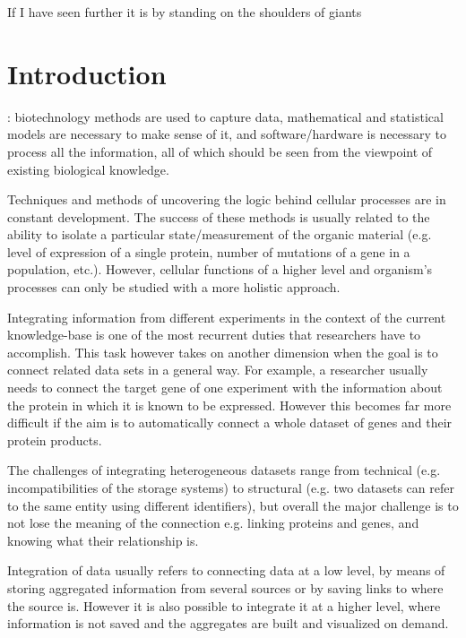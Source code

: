 \begin{savequote}[75mm] 
If I have seen further it is by standing on the shoulders of giants
\end{savequote}

\chapter{Introduction} \label{ch:introduction}

: biotechnology methods are used to capture data, mathematical and statistical models are necessary to make sense of it, and software/hardware is necessary to process all the information,  all of which should be seen from the viewpoint of existing biological knowledge.

Techniques and methods of uncovering the logic behind cellular processes are in constant development. The success of these methods is usually related to the ability to isolate a particular state/measurement of the organic material (e.g. level of expression of a single protein, number of mutations of a gene in a population, etc.). However,  cellular functions of a higher level and organism's processes can only be studied with a more holistic approach.

Integrating information from different experiments in the context of the current knowledge-base is one of the most recurrent duties that researchers have to accomplish. This task however takes on another dimension when the goal is to connect related data sets in a general way. For example, a researcher usually needs to connect the target gene of one experiment with the information about the protein in which it is known to be expressed.  However this becomes far more difficult if the aim is to automatically connect a whole dataset of genes and their protein products.

The challenges of integrating heterogeneous datasets range from technical (e.g. incompatibilities of the storage systems) to structural (e.g. two datasets can refer to the same entity using different identifiers), but overall the major challenge is to not lose the meaning of the connection e.g. linking proteins and genes, and knowing what their relationship is.

Integration of data usually refers to connecting data at a low level, by means of storing aggregated information from several sources or by saving links to where the source is. However it is also possible to integrate it at a higher level, where information is not saved and the aggregates are built and visualized on demand.

